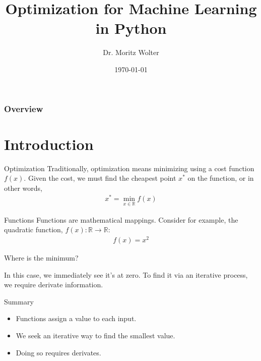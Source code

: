 \documentclass[notes]{beamer}
\title{Optimization for Machine Learning in Python}
\institute{High-Performance Computing and Analytics Lab, Uni Bonn}
\author{Dr. Moritz Wolter}
\date{\today}
\begin{document}
    \maketitle

    \begin{frame}
    \frametitle{Overview} 
    \tableofcontents
    \end{frame}

    \section{Introduction}
    \begin{frame}{Optimization}
      Traditionally, optimization means minimizing using a cost function $f(x)$.
      Given the cost, we must find the cheapest point $x^*$ on the function,
      or in other words,
      \begin{align}
       x^* = \min_{x \in \mathbb{R}} f(x)        
      \end{align}
    \end{frame}

    \begin{frame}{Functions}
      Functions are mathematical mappings. Consider for example, the quadratic function,
      $f(x): \mathbb{R} \rightarrow \mathbb{R}$:
      \begin{align}
        f(x) = x^2
      \end{align}

    \begin{figure}
      
    \end{figure}
    \end{frame}

    \begin{frame}{Where is the minimum?}
      \begin{figure}
        
      \end{figure}
      In this case, we immediately see it's at zero. To find it via an iterative process, we require derivate information.
    \end{frame}

    \begin{frame}{Summary}
      \begin{itemize}
        \item Functions assign a value to each input.
        \item We seek an iterative way to find the smallest value.
        \item Doing so requires derivates.
      \end{itemize}
    \end{frame}
\end{document}
